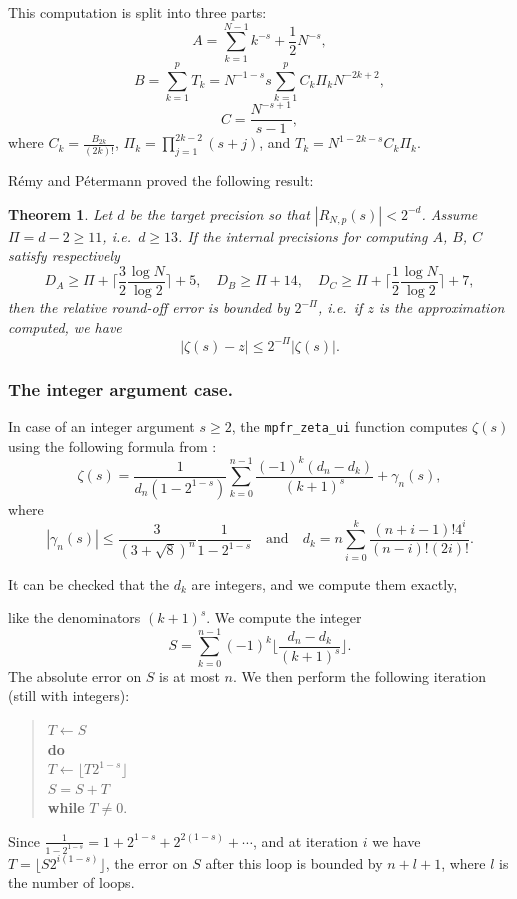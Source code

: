 \documentclass[12pt]{amsart}
\def\q{\hspace*{5mm}}
\DeclareMathOperator{\error}{error}
\newtheorem{theorem}{Theorem}
\begin{document}
This computation is split into three parts:
\[ A = \sum_{k=1}^{N-1} k^{-s} + \frac{1}{2} N^{-s}, \]
\[ B = \sum_{k=1}^p T_k = N^{-1-s} s \sum_{k=1}^p C_k \Pi_k N^{-2k+2}, \]
\[ C = \frac{N^{-s+1}}{s-1}, \]
where $C_k = \frac{B_{2k}}{(2k)!}$, $\Pi_k = \prod_{j=1}^{2k-2} (s+j)$,
and $T_k = N^{1-2k-s} C_k \Pi_k$.

R\'emy and P\'etermann proved the following result:
\begin{theorem}
Let $d$ be the target precision so that $|R_{N,p}(s)| < 2^{-d}$.
Assume $\Pi = d - 2 \geq 11$, i.e.\ $d \geq 13$. If the internal precisions
for computing $A$, $B$, $C$ satisfy respectively
\[ D_A \geq \Pi + \lceil \frac{3}{2} \frac{\log N}{\log 2} \rceil + 5, \quad
   D_B \geq \Pi + 14, \quad
   D_C \geq \Pi + \lceil \frac{1}{2} \frac{\log N}{\log 2} \rceil + 7, \]
then the relative round-off error is bounded by $2^{-\Pi}$, i.e.\ if $z$ is
the approximation computed, we have
\[ |\zeta(s) - z| \leq 2^{-\Pi} |\zeta(s)|. \]
\end{theorem}

\subsubsection{The integer argument case.}
In case of an integer argument $s \geq 2$,
the \texttt{mpfr\_zeta\_ui} function computes
$\zeta(s)$ using the following formula from \cite{Borwein95}:
\[ \zeta(s) = \frac{1}{d_n (1-2^{1-s})} \sum_{k=0}^{n-1} \frac{(-1)^k
  (d_n - d_k)}{(k+1)^s} + \gamma_n(s), \]
where
\[ |\gamma_n(s)| \leq \frac{3}{(3+\sqrt{8})^n} \frac{1}{1-2^{1-s}}
\quad \mbox{and} \quad
   d_k = n \sum_{i=0}^k \frac{(n+i-1)! 4^i}{(n-i)! (2i)!}. \]

It can be checked that the $d_k$ are integers, and we compute them exactly,

like the denominators $(k+1)^s$.
We compute the integer
\[ S =
\sum_{k=0}^{n-1} (-1)^k \lfloor \frac{d_n - d_k}{(k+1)^s}
\rfloor. \]
The absolute error on $S$ is at most $n$. We then perform the following
iteration (still with integers):
\begin{quote}
$T \leftarrow S$ \\
\textbf{do} \\
\q $T \leftarrow \lfloor T 2^{1-s} \rfloor$ \\
\q $S = S + T$ \\
\textbf{while} $T \neq 0$.
\end{quote}
Since $\frac{1}{1-2^{1-s}} = 1 + 2^{1-s} + 2^{2(1-s)} + \cdots$, and
at iteration $i$ we have $T = \lfloor S 2^{i(1-s)} \rfloor$,
the error on $S$ after this loop is bounded by $n+l+1$,
where $l$ is the number of loops.
\end{document}
